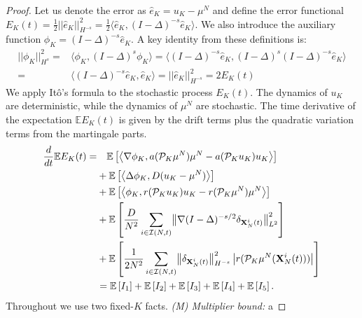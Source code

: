 \documentclass[a4paper,fleqn]{cas-sc}
\theoremstyle{definition}
\theoremstyle{remark}
\begin{document}
\begin{proof}
    Let us denote the error as $\hat{e}_{K} = u_{K}-\mu^{N}$ and define the error functional $E_{K}(t) = \frac{1}{2}||\hat{e}_{K}||_{H^{-s}}^{2} = \frac{1}{2}\langle\hat{e}_{K},(I-\Delta)^{-s}\hat{e}_{K}\rangle$. We also introduce the auxiliary function $\phi_{K} = (I-\Delta)^{-s}\hat{e}_{K}$. A key identity from these definitions is:
    \begin{equation}
        \begin{aligned}
            ||\phi_{K}||_{H^{s}}^{2} =& \langle \phi_K, (I-\Delta)^s \phi_K \rangle = \langle (I-\Delta)^{-s} \hat{e}_K, (I-\Delta)^s (I-\Delta)^{-s} \hat{e}_K \rangle\\
            =& \langle (I-\Delta)^{-s} \hat{e}_K, \hat{e}_K \rangle = ||\hat{e}_K||_{H^{-s}}^2= 2E_{K}(t)
        \end{aligned}
    \end{equation}
We apply It\^o's formula to the stochastic process $E_K(t)$. The dynamics of $u_K$ are deterministic, while the dynamics of $\mu^N$ are stochastic. The time derivative of the expectation $\mathbb{E}E_K(t)$ is given by the drift terms plus the quadratic variation terms from the martingale parts.
\begin{equation}
 \begin{aligned}
 \frac{d}{dt} \mathbb E  E_K(t)  = &   \quad \mathbb E \left[\left\langle \nabla  \phi_K , a(\mathcal P_K \mu^N) \mu^N-  a(\mathcal P_K u_K) u_K   \right\rangle \right] \\
  & +  \mathbb E \left[\left\langle \Delta  \phi_K , D (u_K - \mu^N) \right\rangle \right] \\
  & + \mathbb E \left[\left\langle   \phi_K , r(\mathcal P_K u_K)u_K - r(\mathcal P_K \mu^N)\mu^N \right\rangle \right]  \\
  & +  \mathbb E \left[\frac{D}{N^2} \sum_{i\in \mathcal I (N,t)}  \bigl\|\nabla (I-\Delta)^{-s/2}\delta_{\mathbf{X}_N^i(t)}\bigr\|_{L^2}^2 \right] \\
  & + \mathbb E \left[\frac{1}{2N^2} \sum_{i\in \mathcal I (N,t)} \bigl\|\delta_{\mathbf{X}_N^i(t)}\bigr\|_{H^{-s}}^2 \left|r(\mathcal{P}_K \mu^N(\mathbf{X}_N^i(t)))\right|\right]\\
  & = \mathbb E \left[I_1\right]+\mathbb E \left[I_2\right]+\mathbb E \left[I_3\right]+\mathbb E \left[I_4\right]+
  \mathbb E \left[I_5\right].
 \end{aligned}
\end{equation}
Throughout we use two fixed-$K$ facts. \emph{(M) Multiplier bound:} a

\end{proof}
\end{document}
